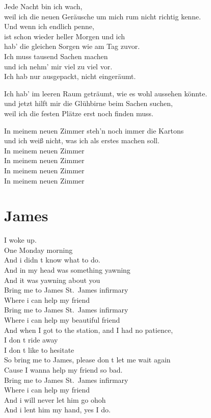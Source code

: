 \documentclass[]{book}
\begin{document}
Jede Nacht bin ich wach,\\
weil ich die neuen Geräusche um mich rum nicht richtig kenne.\\
Und wenn ich endlich penne,\\
ist schon wieder heller Morgen und ich\\
hab' die gleichen Sorgen wie am Tag zuvor.\\
Ich muss tausend Sachen machen\\
und ich nehm' mir viel zu viel vor.\\
Ich hab nur ausgepackt, nicht eingeräumt.

Ich hab' im leeren Raum geträumt, wie es wohl aussehen könnte.\\
und jetzt hilft mir die Glühbirne beim Sachen suchen,\\
weil ich die festen Plätze erst noch finden muss.

In meinem neuen Zimmer steh'n noch immer die Kartons\\
und ich weiß nicht, was ich als erstes machen soll.\\
In meinem neuen Zimmer\\
In meinem neuen Zimmer\\
In meinem neuen Zimmer\\
In meinem neuen Zimmer

\hypertarget{james}{%
\section{James}\label{james}}

I woke up.\\
One Monday morning\\
And i didn t know what to do.\\
And in my head was something yawning\\
And it was yawning about you\\
Bring me to James St.~James infirmary\\
Where i can help my friend\\
Bring me to James St.~James infirmary\\
Where i can help my beautiful friend\\
And when I got to the station, and I had no patience,\\
I don t ride away\\
I don t like to hesitate\\
So bring me to James, please don t let me wait again\\
Cause I wanna help my friend so bad.\\
Bring me to James St.~James infirmary\\
Where i can help my friend\\
And i will never let him go ohoh\\
And i lent him my hand, yes I do.
\end{document}
